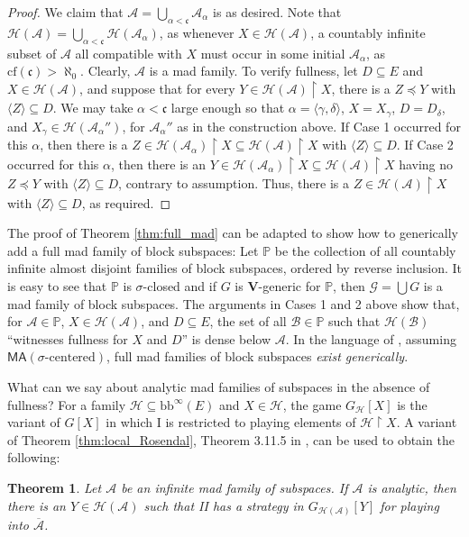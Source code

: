 \documentclass[11pt]{amsart}
\renewcommand{\bar}{\overline}
\newcommand{\restr}{\upharpoonright}
\renewcommand{\P}{\mathbb{P}}
\newcommand{\LA}{\mathcal{A}}
\newcommand{\LB}{\mathcal{B}}
\newcommand{\LG}{\mathcal{G}}
\newtheorem{thm}{Theorem}[section]
\theoremstyle{definition}
\theoremstyle{remark}
\newcommand{\LH}{\mathcal{H}}
\newcommand{\cf}{\mathrm{cf}}
\newcommand{\MA}{\mathsf{MA}}
\newcommand{\bb}{\mathrm{bb}}
\renewcommand{\P}{\mathbb{P}}
\renewcommand{\1}{\mathbf{1}}
\newcommand{\V}{\mathbf{V}}
\newcommand{\cc}{\mathfrak{c}}
\begin{document}
\begin{proof}
	We claim that $\LA=\bigcup_{\alpha<\cc}\LA_\alpha$ is as desired. Note that $\LH(\LA)=\bigcup_{\alpha<\cc}\LH(\LA_\alpha)$, as whenever $X\in\LH(\LA)$, a countably infinite subset of $\LA$ all compatible with $X$ must occur in some initial $\LA_\alpha$, as $\cf(\cc)>\aleph_0$. Clearly, $\LA$ is a mad family. To verify fullness, let $D\subseteq E$ and $X\in\LH(\LA)$, and suppose that for every $Y\in\LH(\LA)\restr X$, there is a $Z\preceq Y$ with $\langle Z\rangle\subseteq D$. We may take $\alpha<\cc$ large enough so that $\alpha=\langle\gamma,\delta\rangle$, $X=X_\gamma$, $D=D_\delta$, and $X_\gamma\in\LH(\LA_\alpha'')$, for $\LA_\alpha''$ as in the construction above. If Case 1 occurred for this $\alpha$, then there is a $Z\in\LH(\LA_\alpha)\restr X\subseteq\LH(\LA)\restr X$ with $\langle Z\rangle\subseteq D$. If Case 2 occurred for this $\alpha$, then there is an $Y\in\LH(\LA_\alpha)\restr X\subseteq\LH(\LA)\restr X$ having no $Z\preceq Y$ with $\langle Z\rangle\subseteq D$, contrary to assumption. Thus, there is a $Z\in\LH(\LA)\restr X$ with $\langle Z\rangle\subseteq D$, as required.
\end{proof}

The proof of Theorem \ref{thm:full_mad} can be adapted to show how to generically add a full mad family of block subspaces: Let $\P$ be the collection of all countably infinite almost disjoint families of block subspaces, ordered by reverse inclusion. It is easy to see that $\P$ is $\sigma$-closed and if $G$ is $\V$-generic for $\P$, then $\LG=\bigcup G$ is a mad family of block subspaces. The arguments in Cases 1 and 2 above show that, for $\LA\in\P$, $X\in\LH(\LA)$, and $D\subseteq E$, the set of all $\LB\in\P$ such that $\LH(\LB)$ ``witnesses fullness for $X$ and $D$'' is dense below $\LA$. In the language of \cite{MR3631288}, assuming $\MA(\sigma\text{-centered})$, full mad families of block subspaces \emph{exist generically}.

What can we say about analytic mad families of subspaces in the absence of fullness? For a family $\LH\subseteq\bb^\infty(E)$ and $X\in\LH$, the game $G_\LH[X]$ is the variant of $G[X]$ in which I is restricted to playing elements of $\LH\restr X$. A variant of Theorem \ref{thm:local_Rosendal}, Theorem 3.11.5 in \cite{Smythe_thesis}, can be used to obtain the following:

\begin{thm}
	Let $\LA$ be an infinite mad family of subspaces. If $\LA$ is analytic, then there is an $Y\in\LH(\LA)$ such that II has a strategy in $G_{\LH(\LA)}[Y]$ for playing into $\bar{\LA}$.
\end{thm}
\end{document}
